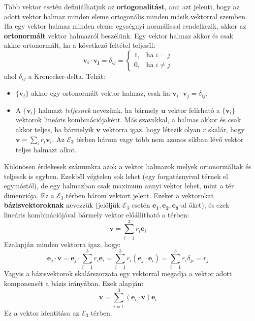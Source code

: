 \documentclass[../main.tex]{subfiles}
\begin{document}
Több vektor esetén definiálhatjuk az \textbf{ortogonalitást}, ami azt jelenti, hogy az adott vektor halmaz minden eleme ortogonális minden másik vektorral szemben.
Ha egy vektor halmaz minden eleme egységnyi normálissal rendelkezik, akkor az \textbf{ortonormált} vektor halmazról beszélünk.
Egy vektor halmaz akkor és csak akkor ortonormált, ha a következő feltétel teljesül:
\begin{equation}
    \mathbf{v_i} \cdot \mathbf{v_j} = \delta_{ij} =
    \begin{cases}
        1, & \text{ha } i = j\\
        0, & \text{ha } i \neq j
    \end{cases}
\end{equation}
ahol $\delta_{ij}$ a Kronecker-delta. Tehát:
\begin{itemize}
    \item $\{\mathbf{v}_i\}$ akkor egy ortonormált vektor halmaz, csak ha $\mathbf{v}_i \cdot \mathbf{v}_j = \delta_{ij}$.
    \item A $\{\mathbf{v}_i\}$ halmazt \textit{teljesnek} nevezünk, ha bármely $\mathbf{u}$ vektor felírható a $\{\mathbf{v}_i\}$ vektorok lineáris kombinációjaként. Más szavakkal, a halmas akkor és csak akkor teljes, ha bármelyik $\mathbf{v}$ vektorra igaz, hogy létezik olyan $r$ skalár, hogy $\mathbf{v} = \sum_i r_i \mathbf{v}_i$. Az $\mathcal{E}_3$ térben három vagy több nem azonos síkban lévő vektor teljes halmazt alkot.
\end{itemize}

Különösen érdekesek számunkra azok a vektor halmazok melyek ortonormáltak és teljesek is egyben. Ezekből végtelen sok lehet (egy forgatásnyival térnek el egymástól), de egy halmazban csak maximum annyi vektor lehet, mint a tér dimenziója.
Ez a $\mathcal{E}_3$ térben három vektort jelent. Ezeket a vektorokat \textbf{bázisvektoroknak} nevezzük (jelöljük $\mathcal{E}_3$ esetén $\mathbf{e_1}, \mathbf{e_2}, \mathbf{e_3}$-al őket), és ezek lineáris kombinációjával bármely vektor előállítható a térben:
\begin{equation}
    \mathbf{v} = \sum_{i=1}^{3} r_i \mathbf{e}_i
\end{equation}
Ezalapján minden vektorra igaz, hogy:
\begin{equation}
    \mathbf{e}_j \cdot \mathbf{v} = \mathbf{e}_j \cdot \sum_{i=1}^{3} r_i \mathbf{e}_i = \sum_{i=1}^{3} r_i (\mathbf{e}_j \cdot \mathbf{e}_i) = \sum_{i=1}^{3} r_i \delta_{ji} = r_j
\end{equation}
Vagyis a bázisvektorok skalárszorzata egy vektorral megadja a vektor adott komponensét a bázis irányában. Ezek alapján:
\begin{equation}
    \mathbf{v} = \sum_{i=1}^{3} (\mathbf{e}_i \cdot \mathbf{v}) \mathbf{e}_i
\end{equation}
Ez a vektor identitása az $\mathcal{E}_3$ térben.
\end{document}
